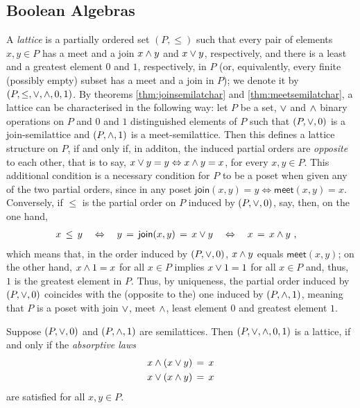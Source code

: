 \subsection{Boolean Algebras}
A \emph{lattice} is a partially ordered set $(P,\leq)$ such that every
pair of elements $x,y\in P$ has a meet and a join $x\wedge y$ and
$x\vee y$, respectively, and there is a least and a greatest element
$0$ and $1$, respectively, in $P$ (or, equivalently, every finite (possibly
empty) subset has a meet and a join in $P$); we denote it by
$(P,\leq,\vee,\wedge,0,1)$.
By theorems \ref{thm:joinsemilatchar} and \ref{thm:meetsemilatchar},
a lattice can be characterised in the following way: let $P$ be a set,
$\vee$ and $\wedge$ binary operations on $P$ and $0$ and $1$
distinguished elements of $P$ such that $(P,\vee,0)$ is a
join-semilattice and $(P,\wedge,1)$ is a meet-semilattice.
Then this defines a lattice structure on $P$, if and only if, in additon,
the induced partial orders are \emph{opposite} to each other, that is to say,
$x\vee y=y\Leftrightarrow x\wedge y=x$, for every $x,y\in P$.
This additional condition is a necessary condition for $P$ to be a poset
when given any of the two partial orders, since in any poset
$\mathsf{join}(x,y)=y\Leftrightarrow\mathsf{meet}(x,y)=x$. Conversely,
if $\leq$ is the partial order on $P$ induced by $(P,\vee,0)$, say,
then, on the one hand,
\begin{align*}
	x & \,\leq\, y \quad\Leftrightarrow\quad
	y\,=\,\mathsf{join}(x,y)\,=\,x\vee y \quad\Leftrightarrow\quad
	x\,=\,x\wedge y
	\text{ ,}
\end{align*}
%
which means that, in the order induced by $(P,\vee,0)$, $x\wedge y$
equals $\mathsf{meet}(x,y)$; on the other hand, $x\wedge 1=x$ for all
$x\in P$ implies $x\vee 1=1$ for all $x\in P$ and, thus, $1$ is the
greatest element in $P$. Thus, by uniqueness, the partial order induced by
$(P,\vee,0)$ coincides with the (opposite to the) one induced by
$(P,\wedge,1)$, meaning that $P$ is a poset with join $\vee$,
meet $\wedge$, least element $0$ and greatest element $1$.

\begin{propoAbsorptiveLaws}\label{thm:absorptivelaws}
	Suppose $(P,\vee,0)$ and $(P,\wedge,1)$ are semilattices.
	Then $(P,\vee,\wedge,0,1)$ is a lattice, if and only if
	the \emph{absorptive laws}
	\begin{equation}
		\label{eq:absorptivelaws}
		\begin{aligned}
			x\wedge (x\vee y) & \,=\, x \\
			x\vee (x\wedge y) & \,=\, x
		\end{aligned}
	\end{equation}
	are satisfied for all $x,y\in P$.
\end{propoAbsorptiveLaws}

